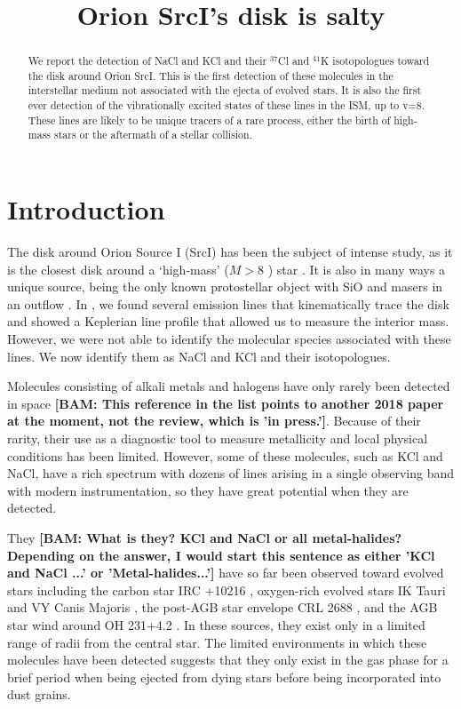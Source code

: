 \documentclass[twocolumn]{aastex62}
\newcommand{\sourcei}{SrcI\xspace}
\newcommand{\bam}[1]{\textcolor{green!65!black}{\textbf{[BAM: #1]}}}
\begin{document}


\title{Orion \sourcei's disk is salty}
\begin{abstract}
    We report the detection of NaCl and KCl and their $^{37}$Cl and $^{41}$K
    isotopologues toward the disk around Orion \sourcei.
    This is the first detection of these molecules in the interstellar
    medium not associated with the ejecta of evolved stars.  It is also
    the first ever detection of the vibrationally excited states of these
    lines in the ISM, up to v=8.
    These lines are likely to be unique tracers of a rare process, either
    the birth of high-mass stars or the aftermath of a stellar collision.
\end{abstract}

\section{Introduction}
The disk around Orion Source I (\sourcei) has been the subject of intense
study, as it is the closest disk around a `high-mass' ($M>8$ \msun) star
\citep{Hirota2014a,Plambeck2016a,Ginsburg2018b}.  It is also in many ways
a unique source, being the only known protostellar object with SiO and \water
masers in an outflow \citep{Goddi2009a,Goddi2010a,Greenhill2013a}.
In \citet{Ginsburg2018b}, we found several emission lines that kinematically
trace the disk and showed a Keplerian line profile that allowed us to measure
the interior mass.  However, we were not able to identify the molecular
species associated with these lines.  We now identify them as NaCl and KCl
and their isotopologues.

Molecules consisting of alkali metals and halogens have only rarely been
detected in space  \citep[e.g., see the review
by][]{XXX} \bam{This reference in the list points to another 2018 paper at the moment, not the review, which is 'in press.'}.   Because of their rarity, their use as a diagnostic
tool to measure metallicity and local physical conditions has been limited.
However, some of these molecules, such as KCl and NaCl, have a rich spectrum
with dozens of lines arising in a single observing band with modern
instrumentation, so they have great potential when they are detected.

They \bam{What is they? KCl and NaCl or all metal-halides?  Depending on the answer, I would start this sentence as either 'KCl and NaCl ...' or 'Metal-halides...'} have so far been observed toward evolved stars including the carbon star IRC
+10216 \citep{Cernicharo1987a}, oxygen-rich evolved stars IK Tauri and VY Canis
Majoris \citep{Milam2007a}, the post-AGB star envelope CRL 2688
\citep{Highberger2003a}, and the AGB star wind around OH 231+4.2
\citep{Sanchez-Contreras2018a}.  In these sources, they exist only in a limited
range of radii from the central star.  The limited environments in which these molecules have been
detected suggests that they only exist in the gas phase for a brief period when
being ejected from dying stars before being incorporated into dust grains.
\end{document}
